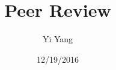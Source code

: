 \documentclass[letterpaper]{article}
\author{Yi Yang}
\title{Peer Review}
\begin{document}
\date{12/19/2016}
\maketitle

\newcommand{\trace}{\mathrm{trace}}
\newcommand{\real}{\mathbb R}  %
\newcommand{\nat}{\mathbb N}   %
\newcommand{\cp}{\mathbb C}    %
\newcommand{\ds}{\displaystyle}
\newcommand{\mf}[2]{\frac{\ds #1}{\ds #2}}
\newcommand{\spanof}[1]{\textrm{span} \{ #1 \}}
\newcommand{\sol}[0]{\textbf{Solution: }}
\newcommand{\pf}[0]{\textbf{Proof:}}
\newcommand{\rme}[0]{\textrm{e}}
\newcommand{\Null}[1]{\textrm{Null}\{#1\}}
\parindent 0pt
\end{document}
